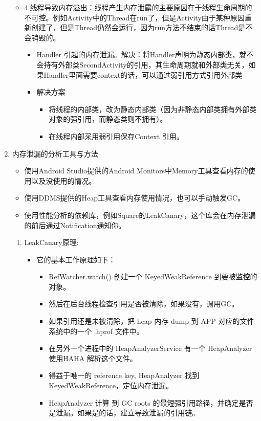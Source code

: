 \documentclass[9pt, b5paper]{article}
\begin{document}
\begin{enumerate}
\begin{itemize}
\begin{itemize}
\end{itemize}
\item 4.线程导致内存溢出：线程产生内存泄露的主要原因在于线程生命周期的不可控。例如Activity中的Thread在run了，但是Activity由于某种原因重新创建了，但是Thread仍然会运行，因为run方法不结束的话Thread是不会销毁的。
\begin{itemize}
\item Handler 引起的内存泄漏。解决：将Handler声明为静态内部类，就不会持有外部类SecondActivity的引用，其生命周期就和外部类无关，如果Handler里面需要context的话，可以通过弱引用方式引用外部类
\item 解决方案
\begin{itemize}
\item 将线程的内部类，改为静态内部类（因为非静态内部类拥有外部类对象的强引用，而静态类则不拥有）。
\item 在线程内部采用弱引用保存Context 引用。
\end{itemize}
\end{itemize}
\end{itemize}
\item 内存泄漏的分析工具与方法
\label{sec-1-1-7-2}
\begin{itemize}
\item 使用Android Studio提供的Android Monitors中Memory工具查看内存的使用以及没使用的情况。
\item 使用DDMS提供的Heap工具查看内存使用情况，也可以手动触发GC。
\item 使用性能分析的依赖库，例如Square的LeakCanary，这个库会在内存泄漏的前后通过Notification通知你。
\end{itemize}
\begin{enumerate}
\item LeakCanary原理:
\label{sec-1-1-7-2-1}
\begin{itemize}
\item 它的基本工作原理如下：
\begin{itemize}
\item RefWatcher.watch() 创建一个 KeyedWeakReference 到要被监控的对象。
\item 然后在后台线程检查引用是否被清除，如果没有，调用GC。
\item 如果引用还是未被清除，把 heap 内存 dump 到 APP 对应的文件系统中的一个 .hprof 文件中。
\item 在另外一个进程中的 HeapAnalyzerService 有一个 HeapAnalyzer 使用HAHA 解析这个文件。
\item 得益于唯一的 reference key, HeapAnalyzer 找到 KeyedWeakReference，定位内存泄漏。
\item HeapAnalyzer 计算 到 GC roots 的最短强引用路径，并确定是否是泄漏。如果是的话，建立导致泄漏的引用链。

\end{itemize}
\end{itemize}
\end{enumerate}
\end{enumerate}
\end{document}
